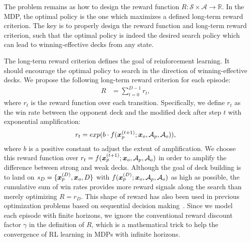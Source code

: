 

The problem remains as how to design the reward function $R: \mathcal{S} \times \mathcal{A} \rightarrow \mathbb{R}$. In the MDP, the optimal policy is the one which maximizes a defined long-term reward criterion. The  key is to properly design the reward function and long-term reward criterion, such that the optimal policy is indeed the desired search policy which can lead to winning-effective decks from any state. 

The long-term reward criterion defines the goal of reinforcement learning. It should encourage the optimal policy to search in the direction of winning-effective decks. We propose the following long-term reward criterion for each episode:
\begin{align}
R &=\sum_{t=0}^{D-1} r_t,
\end{align}
where $r_t$ is the reward function over each transition. Specifically, we define $r_t$ as the win rate between the opponent deck and the modified deck after step $t$ with exponential amplification:
\begin{align}
    r_t=exp(b \cdot f(\boldsymbol{x}^{(t+1)}_p; \boldsymbol{x}_o, \mathcal{A}_p, \mathcal{A}_o)),
\end{align}
where $b$ is a positive constant to adjust the extent of amplification. We choose this reward function over $r_t=f(\boldsymbol{x}^{(t+1)}_p; \boldsymbol{x}_o, \mathcal{A}_p, \mathcal{A}_o)$ in order to amplify the difference between strong and weak decks. Although the goal of deck building is to land on ${s_D=\{\boldsymbol{x}_p^{(D)}, \boldsymbol{x}_o, D\}}$ with $f(\boldsymbol{x}_p^{(D)}; \boldsymbol{x}_o, \mathcal{A}_p, \mathcal{A}_o)$ as high as possible, the cumulative sum of win rates provides more reward signals along the search than merely optimizing ${R=r_D}$. This shape of reward has also been used in previous optimization problems based on sequential decision making~\cite{andrychowicz2016learning,chenlearning}. Since we model each episode with finite horizons, we ignore the conventional reward discount factor $\gamma$ in the definition of $R$, which is a mathematical trick to help the convergence of RL learning in MDPs with infinite horizons. 

